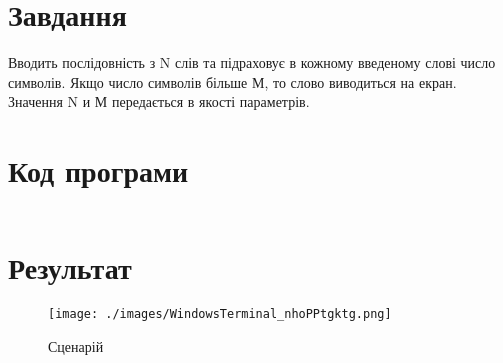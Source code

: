 \section{Завдання}
\label{sec:task}

Вводить послідовність з N слів та підраховує в кожному введеному слові число символів.
Якщо число символів більше М, то слово виводиться на екран.
Значення N и М передається в якості параметрів.

\section{Код програми}
\label{sec:code}
\inputminted{shell}{../src/task1.sh}

\section{Результат}
\label{sec:result}

\begin{figure}[!ht]
    \centering
    \texttt{[image: ./images/WindowsTerminal\_nhoPPtgktg.png]}
    \caption{Сценарій}
    \label{fig:motd}
\end{figure}
